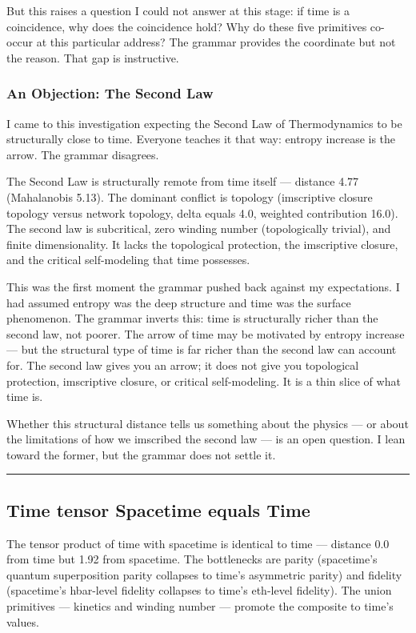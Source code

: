 \documentclass[12pt,a4paper]{article}
\begin{document}
But this raises a question I could not answer at this stage: if time is a coincidence, why does the coincidence hold? Why do these five primitives co-occur at this particular address? The grammar provides the coordinate but not the reason. That gap is instructive.

\subsubsection{An Objection: The Second Law}

I came to this investigation expecting the Second Law of Thermodynamics to be structurally close to time. Everyone teaches it that way: entropy increase is the arrow. The grammar disagrees.

The Second Law is structurally remote from time itself --- distance 4.77 (Mahalanobis 5.13). The dominant conflict is topology (imscriptive closure topology versus network topology, delta equals 4.0, weighted contribution 16.0). The second law is subcritical, zero winding number (topologically trivial), and finite dimensionality. It lacks the topological protection, the imscriptive closure, and the critical self-modeling that time possesses.

This was the first moment the grammar pushed back against my expectations. I had assumed entropy was the deep structure and time was the surface phenomenon. The grammar inverts this: time is structurally richer than the second law, not poorer. The arrow of time may be motivated by entropy increase --- but the structural type of time is far richer than the second law can account for. The second law gives you an arrow; it does not give you topological protection, imscriptive closure, or critical self-modeling. It is a thin slice of what time is.

Whether this structural distance tells us something about the physics --- or about the limitations of how we imscribed the second law --- is an open question. I lean toward the former, but the grammar does not settle it.

\begin{center}
\rule{0.5\textwidth}{0.4pt}
\end{center}

\subsection{Time tensor Spacetime equals Time}

The tensor product of time with spacetime is identical to time --- distance 0.0 from time but 1.92 from spacetime. The bottlenecks are parity (spacetime's quantum superposition parity collapses to time's asymmetric parity) and fidelity (spacetime's hbar-level fidelity collapses to time's eth-level fidelity). The union primitives --- kinetics and winding number --- promote the composite to time's values.
\end{document}
